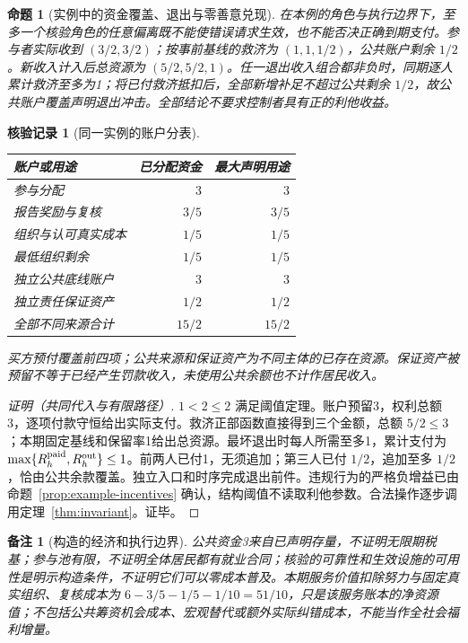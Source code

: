 \documentclass[12pt,a4paper,openany]{report}
\newtheorem{proposition}{命题}[chapter]
\newtheorem{remark}{备注}[chapter]
\newtheorem{Certificate}{核验记录}[chapter]
\begin{document}
\begin{CJK*}{UTF8}{gkai}
\begin{proposition}[实例中的资金覆盖、退出与零善意兑现]
\label{prop:example-closure}
在本例的角色与执行边界下，至多一个核验角色的任意偏离既不能使错误请求生效，也不能否决正确到期支付。参与者实际收到 $(3/2,3/2)$；按事前基线的救济为 $(1,1,1/2)$，公共账户剩余 $1/2$。新收入计入后总资源为 $(5/2,5/2,1)$。任一退出收入组合都非负时，同期逐人累计救济至多为1；将已付救济抵扣后，全部新增补足不超过公共剩余 $1/2$，故公共账户覆盖声明退出冲击。全部结论不要求控制者具有正的利他收益。
\end{proposition}
\begin{Certificate}[同一实例的账户分表]
\leavevmode\par
\begin{center}
\begin{tabular}{L{0.40\textwidth}rr}
\toprule 账户或用途 & 已分配资金 & 最大声明用途\\\midrule
参与分配 & $3$ & $3$\\
报告奖励与复核 & $3/5$ & $3/5$\\
组织与认可真实成本 & $1/5$ & $1/5$\\
最低组织剩余 & $1/5$ & $1/5$\\
独立公共底线账户 & $3$ & $3$\\
独立责任保证资产 & $1/2$ & $1/2$\\\midrule
全部不同来源合计 & $15/2$ & $15/2$\\\bottomrule
\end{tabular}
\end{center}
买方预付覆盖前四项；公共来源和保证资产为不同主体的已存在资源。保证资产被预留不等于已经产生罚款收入，未使用公共余额也不计作居民收入。
\end{Certificate}
\begin{proof}[证明（共同代入与有限路径）]
$1<2\le2$ 满足阈值定理。账户预留3，权利总额3，逐项付款守恒给出实际支付。救济正部函数直接得到三个金额，总额 $5/2\le3$；本期固定基线和保留率1给出总资源。最坏退出时每人所需至多1，累计支付为 $\max\{R_h^{\rm paid},R_h^{\rm out}\}\le1$。前两人已付1，无须追加；第三人已付 $1/2$，追加至多 $1/2$，恰由公共余款覆盖。独立入口和时序完成退出前件。违规行为的严格负增益已由命题~\ref{prop:example-incentives} 确认，结构阈值不读取利他参数。合法操作逐步调用定理~\ref{thm:invariant}。证毕。
\end{proof}

\begin{remark}[构造的经济和执行边界]
公共资金3来自已声明存量，不证明无限期税基；参与池有限，不证明全体居民都有就业合同；核验的可靠性和生效设施的可用性是明示构造条件，不证明它们可以零成本普及。本期服务价值扣除努力与固定真实组织、复核成本为 $6-3/5-1/5-1/10=51/10$，只是该服务账本的净资源值；不包括公共筹资机会成本、宏观替代或额外实际纠错成本，不能当作全社会福利增量。
\end{remark}


\end{CJK*}
\end{document}
